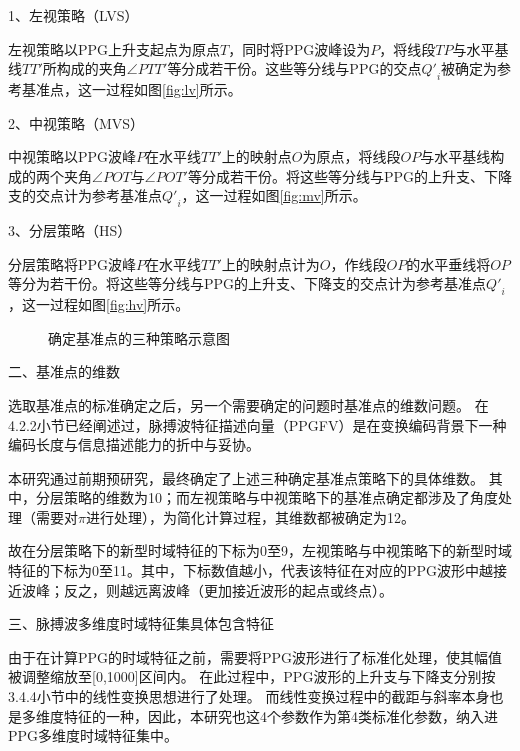 1、左视策略（LVS）

左视策略以PPG上升支起点为原点$T$，同时将PPG波峰设为$P$，将线段$TP$与水平基线$TT'$所构成的夹角$\angle PTT'$等分成若干份。这些等分线与PPG的交点${Q'}_i$被确定为参考基准点，这一过程如图\autoref{fig:lv}所示。

2、中视策略（MVS）

中视策略以PPG波峰$P$在水平线$TT'$上的映射点$O$为原点，将线段$OP$与水平基线构成的两个夹角$\angle POT$与$\angle POT'$等分成若干份。将这些等分线与PPG的上升支、下降支的交点计为参考基准点${Q'}_i$，这一过程如图\autoref{fig:mv}所示。

3、分层策略（HS）

分层策略将PPG波峰$P$在水平线$TT'$上的映射点计为$O$，作线段$OP$的水平垂线将$OP$等分为若干份。将这些等分线与PPG的上升支、下降支的交点计为参考基准点${Q'}_i$，这一过程如图\autoref{fig:hv}所示。

\begin{figure}[htbp]
  \centering
  \quad
  \quad
  \caption{\label{fig:all_views}确定基准点的三种策略示意图}
\end{figure}

二、基准点的维数

选取基准点的标准确定之后，另一个需要确定的问题时基准点的维数问题。
在4.2.2小节已经阐述过，脉搏波特征描述向量（PPGFV）是在变换编码背景下一种编码长度与信息描述能力的折中与妥协。

本研究通过前期预研究，最终确定了上述三种确定基准点策略下的具体维数。
其中，分层策略的维数为10；而左视策略与中视策略下的基准点确定都涉及了角度处理（需要对$\pi$进行处理），为简化计算过程，其维数都被确定为12。

故在分层策略下的新型时域特征的下标为0至9，左视策略与中视策略下的新型时域特征的下标为0至11。其中，下标数值越小，代表该特征在对应的PPG波形中越接近波峰；反之，则越远离波峰（更加接近波形的起点或终点）。

三、脉搏波多维度时域特征集具体包含特征

由于在计算PPG的时域特征之前，需要将PPG波形进行了标准化处理，使其幅值被调整缩放至[0,1000]区间内。
在此过程中，PPG波形的上升支与下降支分别按3.4.4小节中的线性变换思想进行了处理。
而线性变换过程中的截距与斜率本身也是多维度特征的一种，因此，本研究也这4个参数作为第4类标准化参数，纳入进PPG多维度时域特征集中。

